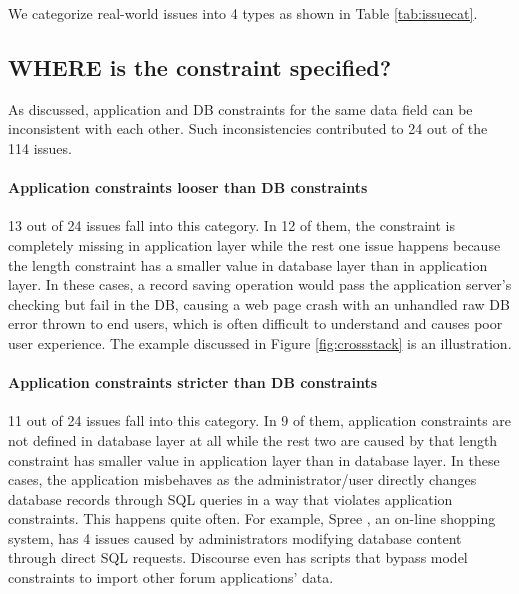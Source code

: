  We categorize \numissues real-world issues 
 into 4 types as shown in Table \ref{tab:issuecat}.
 

\subsection{WHERE is the constraint specified?}
\label{subsec:where}
As discussed, application and DB constraints for the same data field can be inconsistent with each other. Such inconsistencies contributed to 24 out of the 114 issues.

\paragraph{\bf Application constraints looser than DB constraints} 13 out of 24 issues fall into this category. In 12 of them, the constraint is completely missing in application layer while the rest one issue happens because the length constraint has a smaller value in database layer than in application layer.
In these cases, a record saving operation would pass the application server's
checking but fail in the DB, causing a web page crash
with an unhandled raw DB error thrown to end users, which is
often difficult to understand and causes poor user experience. The example discussed in 
Figure \ref{fig:crossstack} is an illustration. 

\paragraph{\bf Application constraints stricter than DB constraints} 11 out of 24 issues fall into this category. In 9 of them, application constraints are not defined in database layer at all while the rest two are caused by that length constraint has smaller value in application layer than in database layer.  
In these cases, the application misbehaves as the administrator/user
directly 
changes database records through SQL queries in a way that violates application constraints. This happens quite often.   For example, Spree \cite{spree}, an on-line shopping system, has 4 issues caused by administrators modifying database content through direct SQL requests. Discourse \cite{discourse} even has scripts that bypass model constraints to import other forum applications' data. 

